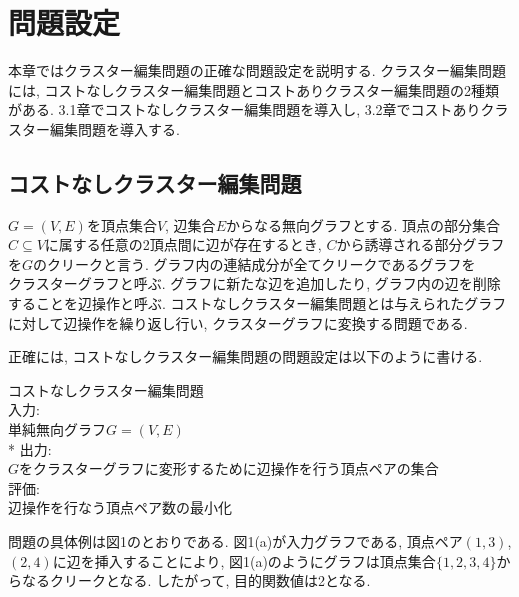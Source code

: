 \documentclass[10.5,a4paper,titlepage, dvipdfmx]{bxjsarticle}
\begin{document}
\section{問題設定}
本章ではクラスター編集問題の正確な問題設定を説明する.
クラスター編集問題には, コストなしクラスター編集問題とコストありクラスター編集問題の2種類がある.
3.1章でコストなしクラスター編集問題を導入し, 3.2章でコストありクラスター編集問題を導入する.

\subsection{コストなしクラスター編集問題}
$G=(V,E)$を頂点集合$V$, 辺集合$E$からなる無向グラフとする. 頂点の部分集合$C \subseteq V$に属する任意の2頂点間に辺が存在するとき, $C$から誘導される部分グラフを$G$の$\textbf{クリーク}$と言う.
グラフ内の連結成分が全てクリークであるグラフを$\textbf{クラスターグラフ}$と呼ぶ.
グラフに新たな辺を追加したり, グラフ内の辺を削除することを辺操作と呼ぶ.
コストなしクラスター編集問題とは与えられたグラフに対して辺操作を繰り返し行い, クラスターグラフに変換する問題である.\par
正確には, コストなしクラスター編集問題の問題設定は以下のように書ける.\\

\begin{screen}
    $\textbf{コストなしクラスター編集問題}$ \\
    入力: \\
    \hspace{15pt} 単純無向グラフ$G=(V,E)$ \\*
    出力: \\
    \hspace{15pt} $G$をクラスターグラフに変形するために辺操作を行う頂点ペアの集合\\
    評価: \\
    \hspace{15pt} 辺操作を行なう頂点ペア数の最小化
\end{screen}

問題の具体例は図1のとおりである.
図1(a)が入力グラフである, 頂点ペア$(1,3)$, $(2,4)$に辺を挿入することにより, 図1(a)のようにグラフは頂点集合$\{1,2,3,4\}$からなるクリークとなる.
したがって, 目的関数値は2となる.
\end{document}
